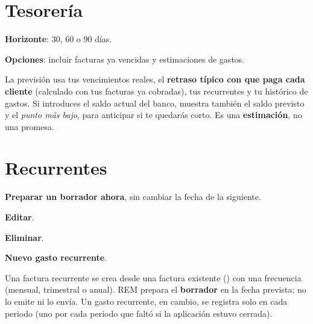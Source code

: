 \section{Tesorería}
\begin{leyenda}
\item[\mk{1}] \textbf{Horizonte}: 30, 60 o 90 días.
\item[\mk{2}] \textbf{Opciones}: incluir facturas ya vencidas y estimaciones de gastos.
\end{leyenda}
La previsión usa tus vencimientos reales, el \textbf{retraso típico con que paga cada cliente} (calculado con tus facturas ya cobradas), tus recurrentes y tu histórico de gastos. Si introduces el saldo actual del banco, muestra también el saldo previsto y el \emph{punto más bajo}, para anticipar si te quedarás corto. Es una \textbf{estimación}, no una promesa.

\section{Recurrentes}
\begin{leyenda}
\item[\mk{1}] \textbf{Preparar un borrador ahora}, sin cambiar la fecha de la siguiente.
\item[\mk{2}] \textbf{Editar}.
\item[\mk{3}] \textbf{Eliminar}.
\item[\mk{4}] \textbf{Nuevo gasto recurrente}.
\end{leyenda}
Una factura recurrente se crea desde una factura existente () con una frecuencia (mensual, trimestral o anual). REM prepara el \textbf{borrador} en la fecha prevista; no lo emite ni lo envía. Un gasto recurrente, en cambio, se registra solo en cada periodo (uno por cada periodo que faltó si la aplicación estuvo cerrada).
